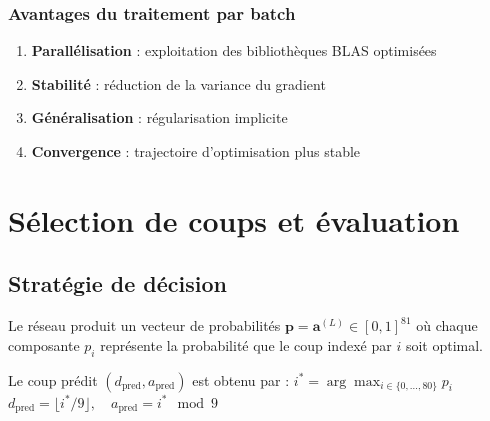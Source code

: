 \documentclass[12pt,a4paper]{report}
\numberwithin{equation}{section}
\begin{document}
\subsection{Avantages du traitement par batch}

\begin{enumerate}
  \item \textbf{Parallélisation} : exploitation des bibliothèques BLAS optimisées
  \item \textbf{Stabilité} : réduction de la variance du gradient
  \item \textbf{Généralisation} : régularisation implicite
  \item \textbf{Convergence} : trajectoire d'optimisation plus stable
\end{enumerate}

\chapter{Sélection de coups et évaluation}

\section{Stratégie de décision}

\begin{definition}
Le réseau produit un vecteur de probabilités $\mathbf{p} = \mathbf{a}^{(L)} \in [0,1]^{81}$ où chaque composante $p_i$ représente la probabilité que le coup indexé par $i$ soit optimal.

Le coup prédit $(d_{\text{pred}}, a_{\text{pred}})$ est obtenu par :
$i^* = \arg\max_{i \in \{0, \ldots, 80\}} p_i$
$d_{\text{pred}} = \lfloor i^* / 9 \rfloor, \quad a_{\text{pred}} = i^* \mod 9$
\end{definition}


\end{document}
